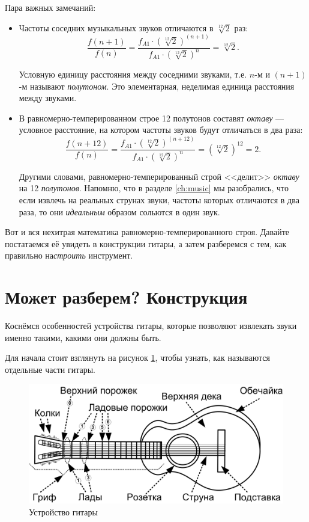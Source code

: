 Пара важных замечаний:
\begin{itemize}
    \item Частоты соседних музыкальных звуков отличаются в $\sqrt[12]{2}$ раз:
    \[
        \frac{f(n+1)}{f(n)} = \frac{f_{A1}\cdot(\sqrt[12]{2})^{(n+1)}}{f_{A1}\cdot(\sqrt[12]{2})^n} = \sqrt[12]{2}.
    \]

    Условную единицу расстояния между соседними звуками, т.е. $n$-м и $(n+1)$-м называют \emph{полутоном}. Это элементарная, неделимая единица расстояния между звуками. 

    \item В равномерно-темперированном строе 12 полутонов составят \emph{октаву} --- условное расстояние, на котором частоты звуков будут отличаться в два раза:
    \[
        \frac{f(n+12)}{f(n)} = \frac{f_{A1}\cdot(\sqrt[12]{2})^{(n+12)}}{f_{A1}\cdot(\sqrt[12]{2})^n} = (\sqrt[12]{2})^{12} = 2.
    \]
    
    Другими словами, равномерно-темперированный строй <<делит>> \emph{октаву} на 12 \emph{полутонов}. Напомню, что в разделе \ref{ch:music} мы разобрались, что если извлечь на реальных струнах звуки, частоты которых отличаются в два раза, то они \emph{идеальным} образом сольются в один звук.
\end{itemize}

Вот и вся нехитрая математика равномерно-темперированного строя. Давайте постатаемся её увидеть в конструкции гитары, а затем разберемся с тем, как правильно на\emph{строить} инструмент.


\section{Может разберем? Конструкция}
\label{ch:guitar:construction}

Коснёмся особенностей устройства гитары, которые позволяют извлекать звуки именно такими, какими они должны быть. 

Для начала стоит взглянуть на рисунок \ref{fig:guitar:construction}, чтобы узнать, как называются отдельные части гитары.

\begin{figure}[!ht]
    \centering
    \includegraphics{fig/guitar-construction} 
    \caption{Устройство гитары}\label{fig:guitar:construction}
\end{figure} 

